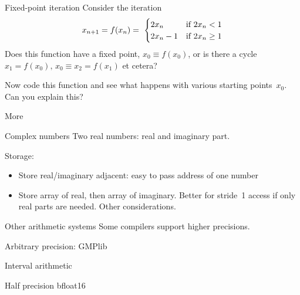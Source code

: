 \begin{exercise}{Fixed-point iteration}
  Consider the iteration
  \[ x_{n+1}=f(x_n) = \
  \begin{cases}
    2x_n&\hbox{if $2x_n<1$}\\
    2x_n-1&\hbox{if $2x_n\geq 1$}\\
  \end{cases}
  \]
  Does this function have a fixed point, $x_0\equiv f(x_0)$, or is there a cycle
  $x_1=f(x_0),\,x_0\equiv x_2=f(x_1)$ et cetera?

  Now code this function and see what happens with various starting
  points~$x_0$. Can you explain this?
\end{exercise}

 {More}

\begin{numberedframe}{Complex numbers}
Two real numbers: real and imaginary part.

Storage:
\begin{itemize}
\item Store real/imaginary adjacent: easy to pass address of one
  number
\item Store array of real, then array of imaginary. Better for
  stride~1 access if only real parts are needed. Other considerations.
\end{itemize}
\end{numberedframe}

\begin{numberedframe}{Other arithmetic systems}
Some compilers support higher precisions.

Arbitrary precision: GMPlib

Interval arithmetic

Half precision bfloat16
\end{numberedframe}


